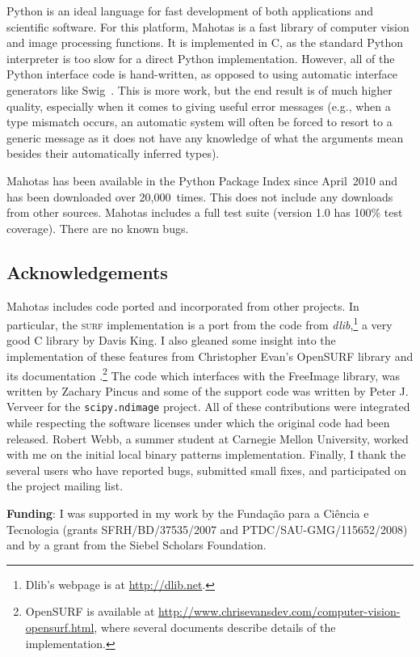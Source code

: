 \documentclass{article}
\newcommand*{\cpp}{{C\nolinebreak[4]\hspace{-.05em}\raisebox{.4ex}{\tiny\textbf{++}}}}
\let\code\texttt
\begin{document}
Python is an ideal language for fast development of both applications and
scientific software. For this platform, Mahotas is a fast library of computer
vision and image processing functions. It is implemented in \cpp{}, as the
standard Python interpreter is too slow for a direct Python implementation.
However, all of the Python interface code is hand-written, as opposed to using
automatic interface generators like Swig~\cite{Beazley2003599}. This is more
work, but the end result is of much higher quality, especially when it comes to
giving useful error messages (e.g., when a type mismatch occurs, an automatic
system will often be forced to resort to a generic message as it does not have
any knowledge of what the arguments mean besides their automatically inferred
types).

Mahotas has been available in the Python Package Index since April~2010 and has
been downloaded over 20,000~times. This does not include any downloads from
other sources. Mahotas includes a full test suite (version 1.0 has 100\% test
coverage). There are no known bugs.

\subsection*{Acknowledgements}

Mahotas includes code ported and incorporated from other projects. In
particular, the \textsc{surf} implementation is a port from the code from
\textit{dlib},\footnote{Dlib's webpage is at \url{http://dlib.net}.} a very
good \cpp{} library by Davis King. I also gleaned some insight into the
implementation of these features from Christopher Evan's OpenSURF library and
its documentation \citep{evans2009}.\footnote{OpenSURF is available at
\url{http://www.chrisevansdev.com/computer-vision-opensurf.html}, where several
documents describe details of the implementation.} The code which interfaces
with the FreeImage library, was written by Zachary Pincus and some of the
support code was written by Peter J. Verveer for the \code{scipy.ndimage}
project. All of these contributions were integrated while respecting the
software licenses under which the original code had been released. Robert Webb,
a summer student at Carnegie Mellon University, worked with me on the initial
local binary patterns implementation. Finally, I thank the several users who
have reported bugs, submitted small fixes, and participated on the project
mailing list.

\textbf{Funding}: I was supported in my work by the Funda\c c\~{a}o para a
Ci\^encia e Tecnologia (grants SFRH/BD/37535/2007 and PTDC/SAU-GMG/115652/2008)
and by a grant from the Siebel Scholars Foundation.

\printbibliography
\end{document}
